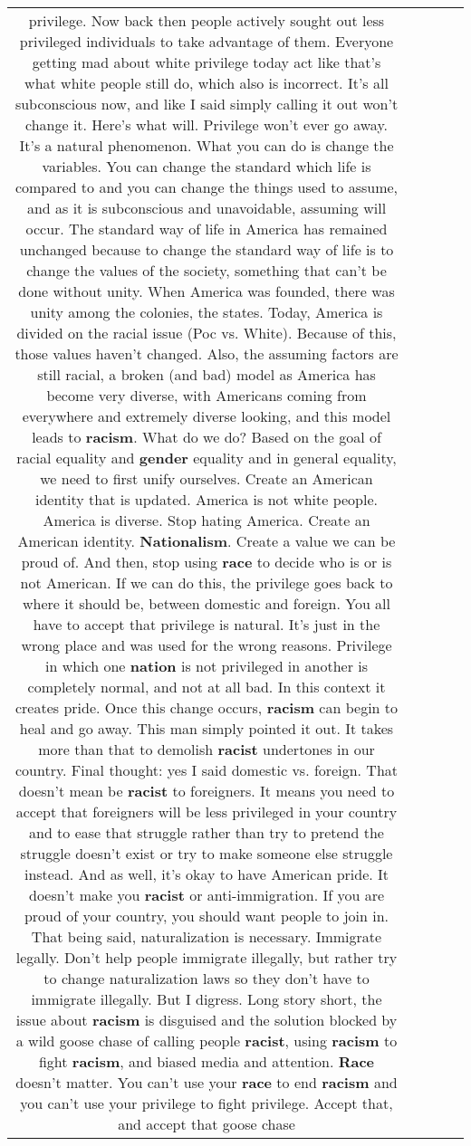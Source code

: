 \documentclass[11pt]{article}
\newlength\mylength
\begin{document}
\begin{center}
\begin{longtable}{|C{.65\mylength}|C{.30\mylength}|C{.12\mylength}|C{.12\mylength}|C{.12\mylength}|}
privilege. Now back then people actively sought out less privileged individuals to take advantage of them. Everyone getting mad about white privilege today act like that's what white people still do, which also is incorrect. It's all subconscious now, and like I said simply calling it out won't change it. Here's what will. Privilege won't ever go away. It's a natural phenomenon. What you can do is change the variables. You can change the standard which life is compared to and you can change the things used to assume, and as it is subconscious and unavoidable, assuming will occur. The standard way of life in America has remained unchanged because to change the standard way of life is to change the values of the society, something that can't be done without unity. When America was founded, there was unity among the colonies, the states. Today, America is divided on the racial issue (Poc vs. White). Because of this, those values haven't changed. Also, the assuming factors are still racial, a broken (and bad) model as America has become very diverse, with Americans coming from everywhere and extremely diverse looking, and this model leads to \textbf{racism}. What do we do? Based on the goal of racial equality and \textbf{gender} equality and in general equality, we need to first unify ourselves. Create an American identity that is updated. America is not white people. America is diverse. Stop hating America. Create an American identity. \textbf{Nationalism}. Create a value we can be proud of. And then, stop using \textbf{race} to decide who is or is not American. If we can do this, the privilege goes back to where it should be, between domestic and foreign. You all have to accept that privilege is natural. It's just in the wrong place and was used for the wrong reasons. Privilege in which one \textbf{nation} is not privileged in another is completely normal, and not at all bad. In this context it creates pride. Once this change occurs, \textbf{racism} can begin to heal and go away. This man simply pointed it out. It takes more than that to demolish \textbf{racist} undertones in our country. Final thought: yes I said domestic vs. foreign. That doesn't mean be \textbf{racist} to foreigners. It means you need to accept that foreigners will be less privileged in your country and to ease that struggle rather than try to pretend the struggle doesn't exist or try to make someone else struggle instead. And as well, it's okay to have American pride. It doesn't make you \textbf{racist} or anti-immigration. If you are proud of your country, you should want people to join in. That being said, naturalization is necessary. Immigrate legally. Don't help people immigrate illegally, but rather try to change naturalization laws so they don't have to immigrate illegally. But I digress. Long story short, the issue about \textbf{racism} is disguised and the solution blocked by a wild goose chase of calling people \textbf{racist}, using \textbf{racism} to fight \textbf{racism}, and biased media and attention. \textbf{Race} doesn't matter. You can't use your \textbf{race} to end \textbf{racism} and you can't use your privilege to fight privilege. Accept that, and accept that goose chase 
\end{longtable}
\end{center}
\end{document}
